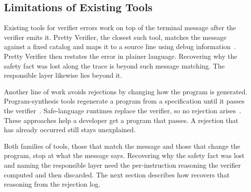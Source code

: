 

\subsection{Limitations of Existing Tools}

 Existing tools for verifier errors work on top of the terminal message after the verifier emits it. Pretty Verifier, the closest such tool, matches the message against a fixed catalog and maps it to a source line using debug information~\cite{rizza2025design}. Pretty Verifier then restates the error in plainer language. Recovering why the safety fact was lost along the trace is beyond such message matching. The responsible layer likewise lies beyond it.

Another line of work avoids rejections by changing how the program is generated. Program-synthesis tools regenerate a program from a specification until it passes the verifier~\cite{zheng2024kgent}. Safe-language runtimes replace the verifier, so no rejection arises~\cite{jia2025rex}. These approaches help a developer get a program that passes. A rejection that has already occurred still stays unexplained.

 Both families of tools, those that match the message and those that change the program, stop at what the message says. Recovering why the safety fact was lost and naming the responsible layer need the per-instruction reasoning the verifier computed and then discarded. The next section describes how \sys recovers that reasoning from the rejection log.